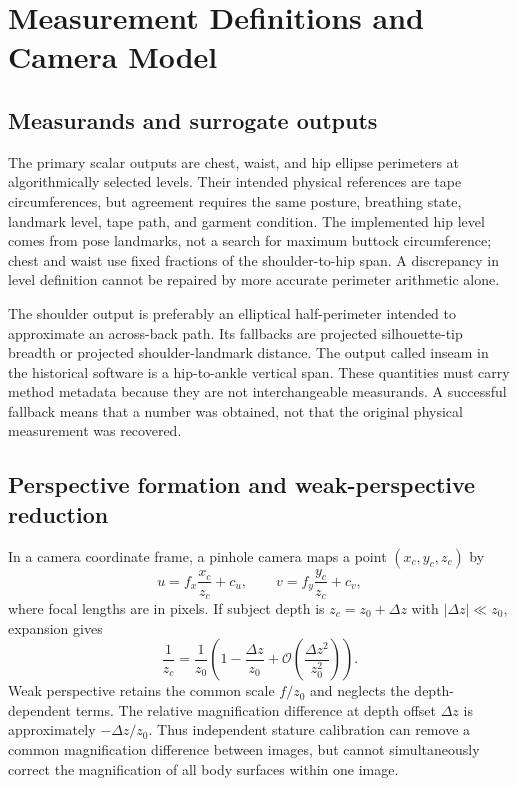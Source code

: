 \documentclass[11pt,a4paper]{article}
\numberwithin{equation}{section}
\begin{document}
\section{Measurement Definitions and Camera Model}
\label{sec:measurement_model}
\subsection{Measurands and surrogate outputs}
The primary scalar outputs are chest, waist, and hip ellipse perimeters at algorithmically selected levels. Their intended physical references are tape circumferences, but agreement requires the same posture, breathing state, landmark level, tape path, and garment condition. The implemented hip level comes from pose landmarks, not a search for maximum buttock circumference; chest and waist use fixed fractions of the shoulder-to-hip span. A discrepancy in level definition cannot be repaired by more accurate perimeter arithmetic alone.

The shoulder output is preferably an elliptical half-perimeter intended to approximate an across-back path. Its fallbacks are projected silhouette-tip breadth or projected shoulder-landmark distance. The output called inseam in the historical software is a hip-to-ankle vertical span. These quantities must carry method metadata because they are not interchangeable measurands. A successful fallback means that a number was obtained, not that the original physical measurement was recovered.

\subsection{Perspective formation and weak-perspective reduction}
In a camera coordinate frame, a pinhole camera maps a point $(x_c,y_c,z_c)$ by
\begin{equation}
u=f_x\frac{x_c}{z_c}+c_u,\qquad v=f_y\frac{y_c}{z_c}+c_v,
\label{eq:pinhole}
\end{equation}
where focal lengths are in pixels. If subject depth is $z_c=z_0+\Delta z$ with $|\Delta z|\ll z_0$, expansion gives
\begin{equation}
\frac{1}{z_c}=\frac{1}{z_0}\left(1-\frac{\Delta z}{z_0}+\mathcal O\left(\frac{\Delta z^2}{z_0^2}\right)\right).
\end{equation}
Weak perspective retains the common scale $f/z_0$ and neglects the depth-dependent terms. The relative magnification difference at depth offset $\Delta z$ is approximately $-\Delta z/z_0$. Thus independent stature calibration can remove a common magnification difference between images, but cannot simultaneously correct the magnification of all body surfaces within one image.
\end{document}

